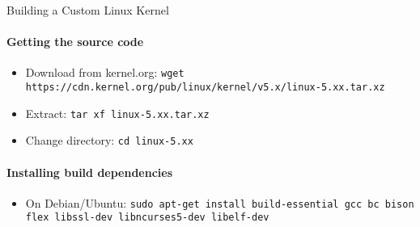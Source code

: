 \begin{KR}{Building a Custom Linux Kernel}\\
    \paragraph{Getting the source code}
    \begin{itemize}
        \item Download from kernel.org: \texttt{wget https://cdn.kernel.org/pub/linux/kernel/v5.x/linux-5.xx.tar.xz}
        \item Extract: \texttt{tar xf linux-5.xx.tar.xz}
        \item Change directory: \texttt{cd linux-5.xx}
    \end{itemize}
    
    \paragraph{Installing build dependencies}
    \begin{itemize}
        \item On Debian/Ubuntu: \texttt{sudo apt-get install build-essential gcc bc bison flex libssl-dev libncurses5-dev libelf-dev}
    \end{itemize}
    

\end{KR}
